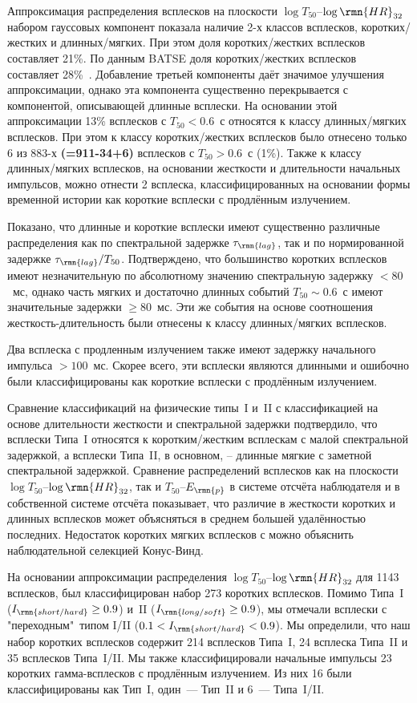 Аппроксимация распределения всплесков на плоскости $\log T_{50}$--$\log \rmn{HR}_{32}$ 
набором гауссовых компонент показала наличие 2-х классов всплесков, коротких/жестких 
и длинных/мягких. При этом доля коротких/жестких всплесков составляет 21\%. По данным 
BATSE доля коротких/жестких всплесков составляет 28\%~\citep{Horvath_2002}.  
Добавление третьей компоненты даёт значимое улучшения аппроксимации, однако эта 
компонента существенно перекрывается с  компонентой, описывающей длинные всплески. 
На основании этой аппроксимации 13\% всплесков с $T_{50} < 0.6$~с относятся к классу 
длинных/мягких всплесков. При этом к классу коротких/жестких всплесков было отнесено 
только 6 из 883-х \textbf{(=911-34+6)} всплесков с $T_{50} >0.6$~с (1\%). 
Также к классу длинных/мягких всплесков, на основании жесткости и длительности 
начальных импульсов, можно отнести 2 всплеска, классифицированных на основании формы 
временной истории как короткие всплески с продлённым излучением. 

Показано, что длинные и короткие всплески имеют существенно различные распределения 
как по спектральной задержке $\tau_{\rmn{lag}}$, так и по нормированной задержке 
$\tau_{\rmn{lag}} / T_{50}$. Подтверждено, что большинство коротких всплесков 
имеют незначительную по абсолютному значению спектральную задержку $< 80$~мс, 
однако часть мягких и достаточно длинных событий $T_{50}\sim 0.6$~с имеют 
значительные задержки $\geq 80$~мс. Эти же события на основе соотношения 
жесткость-длительность были отнесены к классу длинных/мягких всплесков. 

Два всплеска с продленным излучением также имеют задержку начального импульса $> 100$~мс. 
Скорее всего, эти всплески являются длинными и ошибочно были классифицированы 
как короткие всплески с продлённым излучением.  

Сравнение классификаций на физические типы~I и~II с классификацией на основе 
длительности жесткости и спектральной задержки подтвердило, что всплески Типа~I 
относятся к коротким/жестким всплескам с малой спектральной задержкой, а всплески 
Типа~II, в основном, -- длинные мягкие с заметной спектральной задержкой. Сравнение 
распределений всплесков как на плоскости $\log T_{50}$--$\log \rmn{HR}_{32}$, 
так и $T_{50}$--$E_{\rmn{p}}$ в системе отсчёта наблюдателя и в собственной системе 
отсчёта показывает, что различие в жесткости коротких и длинных всплесков может 
объясняться в среднем большей удалённостью последних. Недостаток коротких мягких 
всплесков с можно объяснить наблюдательной селекцией Конус-Винд.

На основании аппроксимации распределения $\log T_{50}$--$\log \rmn{HR}_{32}$ 
для 1143 всплесков, был классифицирован набор 273 коротких всплесков. 
Помимо Типа~I ($I_{\rmn{short/hard}} \geq 0.9$) и~II ($I_{\rmn{long/soft}} \geq 0.9$), 
мы отмечали всплески с "переходным"\ типом I/II ($0.1 < I_{\rmn{short/hard}} < 0.9$). 
Мы определили, что наш набор коротких всплесков содержит 214 всплесков Типа~I, 24 всплеска Типа~II 
и 35 всплесков Типа~I/II. Мы также классифицировали начальные импульсы 23 коротких 
гамма-всплесков с продлённым излучением. Из них 16 были классифицированы как Тип~I, 
один~--- Тип~II и 6~--- Типа~I/II.

\clearpage